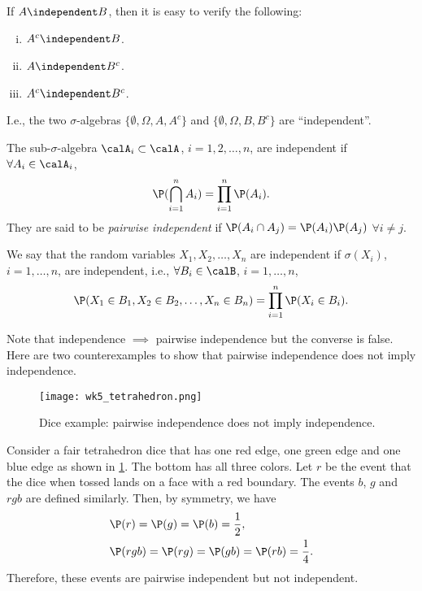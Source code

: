 \documentclass[../aipt.tex]{subfiles}
\begin{document}
If $A \independent B$, then it is easy to verify the following:
\begin{enumerate}[(i)]
\item $A^c \independent B$.
\item $A \independent B^c$.
\item $A^c \independent B^c$.
\end{enumerate}
I.e., the two $\sigma$-algebras $\{\emptyset,\Omega ,A, A^c\}$ and $\{\emptyset,\Omega ,B, B^c\}$ are ``independent''.

\begin{Definition}
The sub-$\sigma$-algebra $\calA_i \subset \calA$, $i=1,2,\ldots, n$, are independent if $\forall A_i \in \calA_i$, 
\begin{align*}
\P(\bigcap_{i=1}^n {A_i})= \prod_{i=1}^n {\P(A_i)}.
\end{align*}
They are said to be \emph{pairwise independent} if $\P(A_i \cap A_j)=\P(A_i)\P(A_j)$ $\forall i \neq j$.
\end{Definition}

We say that the random variables $X_1,X_2,\ldots,X_n$ are independent if $\sigma(X_i)$, $i=1,\ldots,n$, are independent, i.e., $\forall B_i \in \calB$, $i=1,\ldots,n$,
\begin{align*}
\P (X_1\in B_1,X_2\in B_2,\ldots,X_n\in B_n)= \prod_{i=1}^n {\P(X_i \in B_i)}.
\end{align*}

Note that independence $\implies$ pairwise independence but the converse is false. Here are two counterexamples to show that pairwise independence does not imply independence.

\begin{Example}\label{wk5:Independence1}
\begin{figure}[!htb]
\centering
\texttt{[image: wk5\_tetrahedron.png]} 
\caption{Dice example: pairwise independence does not imply independence.} 
\label{wk5:fg:Independence}
\end{figure}
Consider a fair tetrahedron dice that has one red edge, one green edge and one blue edge as shown in \cref{wk5:fg:Independence}. The bottom has all three colors. Let $r$ be the event that the dice when tossed lands on a face with a red boundary. The events $b$, $g$ and $rgb$ are defined similarly. Then, by symmetry, we have
\begin{align*}
&\P (r)=\P(g)=\P(b)=\frac{1}{2}, \\
&\P (rgb)=\P(rg)=\P(gb)=\P(rb)=\frac{1}{4}.
\end{align*}
Therefore, these events are pairwise independent but not independent.
\end{Example}
\end{document}
